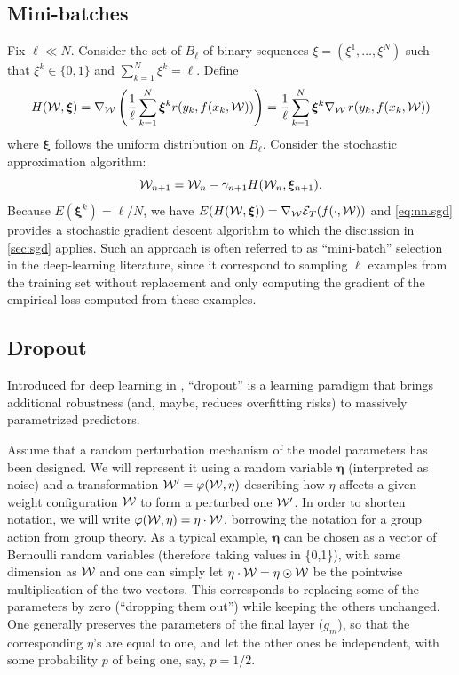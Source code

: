 
\subsection{Mini-batches}
Fix $\ell \ll N$. Consider the set of $B_\ell$ of binary sequences $\xi = (\xi^1, \ldots, \xi^{N})$ such that $\xi^k \in \{0,1\}$ and $\sum_{k=1}^N \xi^k = \ell$.
Define 
\[
H({\mathcal W}, \bm \xi) = \nabla_{\mathcal W} \left(\frac1\ell \sum_{k=1}^N \bm\xi^k r(y_k, f(x_k, {\mathcal W}))\right) = \frac1\ell \sum_{k=1}^N \bm \xi^k \nabla_{{\mathcal W}}\, r(y_k, f(x_k, {\mathcal W}))
\]
where $\boldsymbol \xi$ follows the uniform distribution on $B_\ell$. Consider the stochastic approximation algorithm: 
\begin{equation}
\label{eq:nn.sgd}
{\mathcal W}_{n+1} = {\mathcal W}_n - \gamma_{n+1}  H({\mathcal W}_n, \bm\xi_{n+1}).
\end{equation}
Because $E(\boldsymbol\xi^k) = \ell/N$, we have $E( H({\mathcal W}, \bm\xi)) = \nabla_{\mathcal W} {\mathcal E}_T(f(\cdot, {\mathcal W}))$ and \eqref{eq:nn.sgd} provides a stochastic gradient descent algorithm to which the  discussion in \cref{sec:sgd}  applies. Such an approach is often referred to as ``mini-batch'' selection in the deep-learning literature, since it correspond to sampling $\ell$ examples from the training set without replacement and only computing the gradient of the empirical loss computed from these examples.  

\subsection{Dropout}

Introduced for deep learning in \citet{srivastava2014dropout}, ``dropout'' is a learning paradigm that brings additional robustness (and, maybe, reduces overfitting risks) to massively parametrized predictors.  

Assume that a random perturbation mechanism  of the model parameters has been designed. We will represent it using a random variable $\boldsymbol\eta$ (interpreted as noise) and a transformation ${\mathcal W}' = \varphi({\mathcal W}, \eta)$ describing how $\eta$ affects a given weight configuration ${\mathcal W}$ to form a perturbed one ${\mathcal W}'$. In order to shorten notation, we will write $\varphi({\mathcal W}, \eta) = \eta\cdot {\mathcal W}$, borrowing the notation for a group action from group theory. As a typical example, $\boldsymbol\eta$ can be chosen as a vector of Bernoulli random variables (therefore taking values in \{0,1\}), with same dimension as ${\mathcal W}$ and one can simply let $\eta\cdot {\mathcal W} = \eta\odot {\mathcal W}$ be the pointwise multiplication of the two vectors. This corresponds to replacing some of the parameters by zero (``dropping them out'') while keeping the others unchanged. One generally preserves the parameters of the final layer ($g_m$), so that the corresponding $\eta$'s are equal to one, and let the other ones be independent, with some probability $p$ of  being one, say, $p=1/2$.

